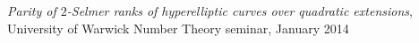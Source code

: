 \documentclass{res}
\begin{document}
\begin{resume}
 {\it Parity of $2$-Selmer ranks of hyperelliptic curves over quadratic extensions}, University of Warwick Number Theory seminar, January 2014  \medskip \\
       
%
%



\end{resume}
\end{document}
